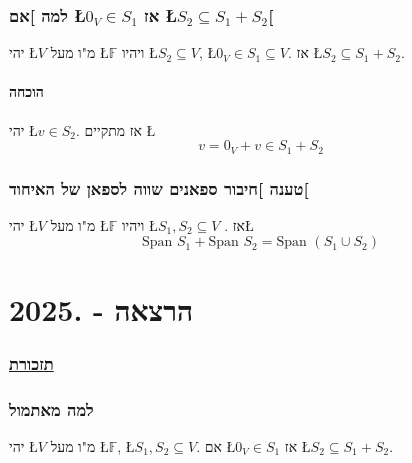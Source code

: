 \documentclass[english,hebrew]{article}
\newcommand{\spn}{\text{Span }}
\begin{document}
\section{למה {]}אם \L{$0_{V}\in S_{1}$} אז \L{$S_{2}\subseteq S_{1}+S_{2}$}{[}}

יהי \L{$V$} מ"ו מעל \L{$\mathbb{F}$} ויהיו \L{$S_{2}\subseteq V$},
\L{$0_{V}\in S_{1}\subseteq V$}. אז \L{$S_{2}\subseteq S_{1}+S_{2}$}.

\subsection{הוכחה}

יהי \L{$v\in S_{2}$}. אז מתקיים \L{%
\[
v=0_{V}+v\in S_{1}+S_{2}
\]
}%

\section{טענה {]}חיבור ספאנים שווה לספאן של האיחוד{[}}

יהי \L{$V$} מ"ו מעל \L{$\mathbb{F}$} ויהיו \L{$S_{1},S_{2}\subseteq V$}
. אז\L{%
\[
\spn S_{1}+\spn S_{2}=\spn(S_{1}\cup S_{2})
\]
}%

\newpage{}

\noindent{}

\part{הרצאה {\endL} - {.2025\endL}}

\section{\uline{תזכורת}}

\section{למה מאתמול}

יהי \L{$V$} מ"ו מעל \L{$\mathbb{F}$}, \L{$S_{1},S_{2}\subseteq V$}.
אם \L{$0_{V}\in S_{1}$} אז \L{$S_{2}\subseteq S_{1}+S_{2}$}.
\end{document}
